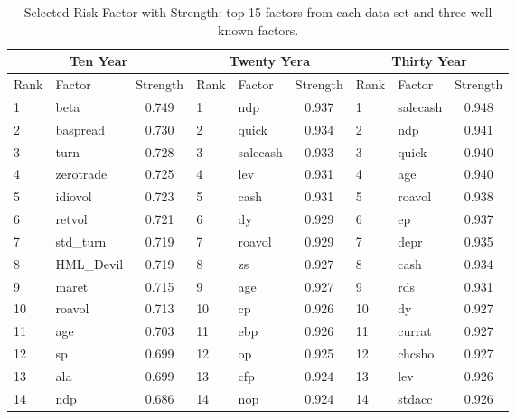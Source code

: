 \begin{table}[]
	\centering
	\caption{Selected Risk Factor with Strength: top 15 factors from each data set and three well known factors.}
	\label{table:top15}
	\begin{tabular}{llc|llc|llc}
		\hline
		\multicolumn{3}{c|}{Ten Year} & \multicolumn{3}{c|}{Twenty Yera} & \multicolumn{3}{c}{Thirty Year} \\ \hline
		Rank & Factor     & Strength & Rank   & Factor     & Strength   & Rank   & Factor     & Strength   \\ \hline
		1   & beta               & 0.749    & 1      & ndp           & 0.937      & 1      & salecash  & 0.948\\
		2   & baspread       & 0.730    & 2      & quick        & 0.934      & 2      & ndp          & 0.941\\
		3   & turn               & 0.728    & 3      & salecash   & 0.933      & 3      & quick      & 0.940\\
		4   & zerotrade      & 0.725    & 4      & lev            & 0.931      & 4      & age         & 0.940\\
		5   & idiovol           & 0.723    & 5      & cash         & 0.931      & 5      & roavol    & 0.938\\
		6   & retvol            & 0.721    & 6      & dy             & 0.929      & 6      & ep           & 0.937\\
		7   & std\_turn      & 0.719    & 7      & roavol      & 0.929      & 7      & depr       & 0.935\\
		8   & HML\_Devil & 0.719    & 8      & zs              & 0.927      & 8      & cash       & 0.934\\
		9   & maret           & 0.715    & 9        & age          & 0.927      & 9      & rds         & 0.931\\
		10 & roavol          & 0.713    & 10     & cp             & 0.926      & 10    & dy          & 0.927 \\
		11 & age               & 0.703    &11      & ebp           & 0.926      & 11     & currat   & 0.927 \\ 
		12 & sp                 & 0.699    &12      & op            & 0.925      &12       & chcsho  & 0.927 \\ 
		13 & ala                & 0.699    &13      & cfp          & 0.924       &13      & lev         & 0.926 \\ 
		14 & ndp              & 0.686    &14      & nop          & 0.924       &14     & stdacc     & 0.926 \\ 

\end{tabular}
\end{table}
